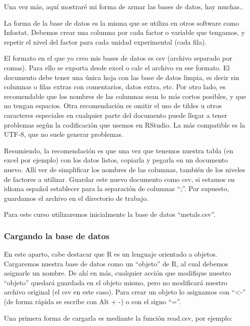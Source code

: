\documentclass[
  letterpaper,
  DIV=11,
  numbers=noendperiod]{scrartcl}
\begin{document}
Una vez más, aquí mostraré mi forma de armar las bases de datos, hay
muchas..

La forma de la base de datos es la misma que se utiliza en otros
software como Infostat. Debemos crear una columna por cada factor o
variable que tengamos, y repetir el nivel del factor para cada unidad
experimental (cada fila).

El formato en el que yo creo mis bases de datos es csv (archivo separado
por comas). Para ello se exporta desde excel o calc el archivo en ese
formato. El documento debe tener una única hoja con las base de datos
limpia, es decir sin columnas o filas extras con comentarios, datos
extra, etc. Por otro lado, es recomendable que los nombres de las
columnas sean lo más cortos posibles, y que no tengan espacios. Otra
recomendación es omitir el uso de tildes u otros caracteres especiales
en cualquier parte del documento puede llegar a tener problemas según la
codificación que usemos en RStudio. La más compatible es la UTF-8, que
no suele generar problemas.

Resumiendo, la recomendación es que una vez que tenemos nuestra tabla
(en excel por ejemplo) con los datos listos, copiarla y pegarla en un
documento nuevo. Allí ver de simplificar los nombres de las columnas,
también de los niveles de factores a utilizar. Guardar este nuevo
documento como csv, si estamos en idioma español establecer para la
separación de columnas ``;''. Por supuesto, guardamos el archivo en el
directorio de trabajo.

Para este curso utilizaremos inicialmente la base de datos
``metals.csv''.

\hypertarget{cargando-la-base-de-datos}{%
\subsubsection{Cargando la base de
datos}\label{cargando-la-base-de-datos}}

En este aparto, cabe destacar que R es un lenguaje orientado a objetos.
Cargaremos nuestra base de datos como un ``objeto'' de R, al cual
debemos asignarle un nombre. De ahí en más, cualquier acción que
modifique nuestro ``objeto'' quedará guardada en el objeto mismo, pero
no modificará nuestro archivo original (el csv en este caso). Para crear
un objeto lo asignamos con ``\textless-'' (de forma rápida se escribe
con Alt + -) o con el signo ``=''.

Una primera forma de cargarla es mediante la función read.csv, por
ejemplo:
\end{document}
